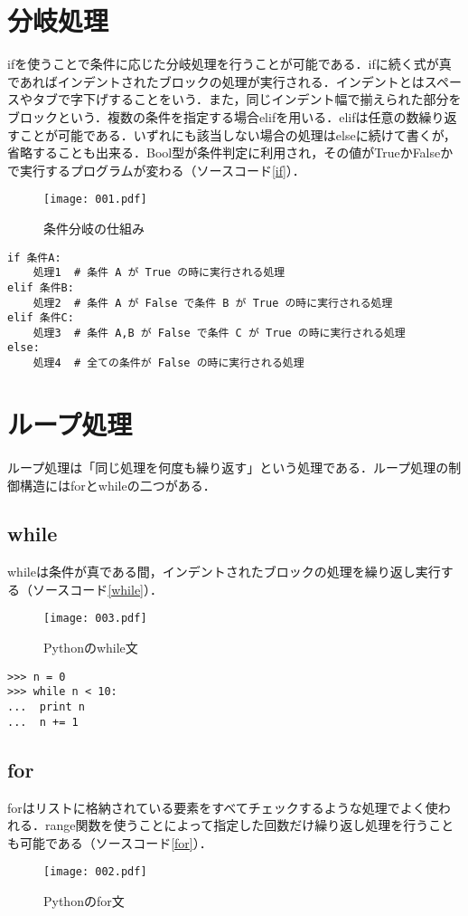 \section{分岐処理}
ifを使うことで条件に応じた分岐処理を行うことが可能である．ifに続く式が真であればインデントされたブロックの処理が実行される．インデントとはスペースやタブで字下げすることをいう．また，同じインデント幅で揃えられた部分をブロックという．複数の条件を指定する場合elifを用いる．elifは任意の数繰り返すことが可能である．いずれにも該当しない場合の処理はelseに続けて書くが，省略することも出来る．Bool型が条件判定に利用され，その値がTrueかFalseかで実行するプログラムが変わる（ソースコード\ref{if}）．
\begin{figure}[h]
 \centering
  \texttt{[image: 001.pdf]}
  \caption{条件分岐の仕組み}
\end{figure}
\begin{lstlisting}[caption=ifの使い方,label=if]
if 条件A:
    処理1  # 条件 A が True の時に実行される処理
elif 条件B:
    処理2  # 条件 A が False で条件 B が True の時に実行される処理
elif 条件C:
    処理3  # 条件 A,B が False で条件 C が True の時に実行される処理
else:
    処理4  # 全ての条件が False の時に実行される処理
\end{lstlisting}

\section{ループ処理}
ループ処理は「同じ処理を何度も繰り返す」という処理である．ループ処理の制御構造にはforとwhileの二つがある．
\subsection{while}
whileは条件が真である間，インデントされたブロックの処理を繰り返し実行する（ソースコード\ref{while}）．
\begin{figure}[h]
 \centering
  \texttt{[image: 003.pdf]}
  \caption{Pythonのwhile文}
  \label{scale}
\end{figure}

\begin{lstlisting}[caption=whileの使い方, label=while]
>>> n = 0
>>> while n < 10:
...	 print n
...	 n += 1
\end{lstlisting}

\subsection{for}
forはリストに格納されている要素をすべてチェックするような処理でよく使われる．range関数を使うことによって指定した回数だけ繰り返し処理を行うことも可能である（ソースコード\ref{for}）．
\begin{figure}[h]
 \centering
  \texttt{[image: 002.pdf]}
  \caption{Pythonのfor文}
\end{figure}

